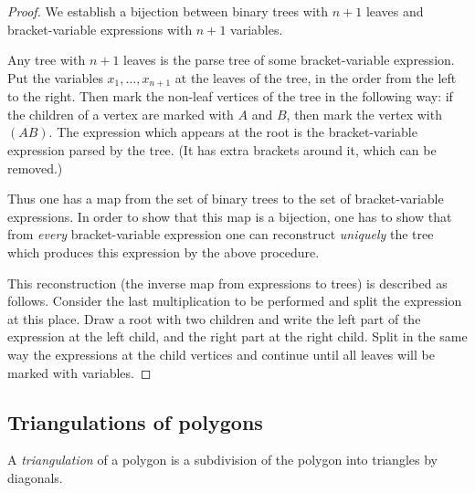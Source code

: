 \begin{page}
\setcounter{section}{4}
\setcounter{subsection}{4}
\setcounter{dfn}{5}
\label{portion:984}

\begin{proof}
We establish a bijection between binary trees with $n+1$ leaves and bracket-variable expressions with $n+1$ variables.

Any tree with $n+1$ leaves is the parse tree of some bracket-variable expression.
Put the variables $x_1, \ldots, x_{n+1}$ at the leaves of the tree, in the order from the left to the right.
Then mark the non-leaf vertices of the tree in the following way:
if the children of a vertex are marked with $A$ and $B$, then mark the vertex with $(AB)$.
The expression which appears at the root is the bracket-variable expression parsed by the tree.
(It has extra brackets around it, which can be removed.)

Thus one has a map from the set of binary trees to the set of bracket-variable expressions.
In order to show that this map is a bijection, one has to show that from \emph{every} bracket-variable expression
one can reconstruct \emph{uniquely} the tree which produces this expression by the above procedure.

This reconstruction (the inverse map from expressions to trees) is described as follows.
Consider the last multiplication to be performed and split the expression at this place.
Draw a root with two children and write the left part of the expression at the left child, and the right part at the right child.
Split in the same way the expressions at the child vertices and continue until all leaves will be marked with variables.
\end{proof}




\end{page}

\begin{page}
\setcounter{section}{4}
\setcounter{subsection}{4}
\setcounter{dfn}{5}
\label{portion:986}

\subsection{Triangulations of polygons}
A \emph{triangulation} of a polygon is a subdivision of the polygon into triangles by diagonals.


\end{page}

